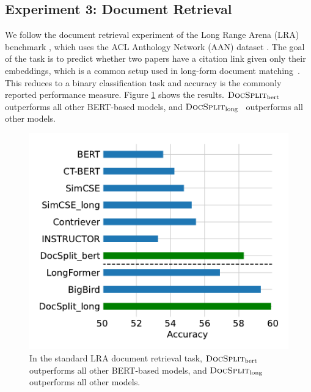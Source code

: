\documentclass[11pt]{article}
\newcommand{\our}{\mbox{\textsc{DocSplit}}}
\newcommand{\ourbert}{$\our_{\mathrm{bert}}$}
\newcommand{\ourlong}{$\our_{\mathrm{long}}$}
\begin{document}
\subsection{Experiment 3: Document Retrieval}
We follow the document retrieval experiment of the Long Range Arena (LRA) benchmark \citep{Tay2020LongRA},
which uses the ACL Anthology Network (AAN) dataset \cite{Radev2009TheAA}.
The goal of the task is to predict whether two papers have a citation link given only their embeddings, which is a common setup used in long-form document matching~\cite{Jiang2019SemanticTM,Yang2020Beyond5T}.
This reduces to a binary classification task and accuracy is the commonly reported performance measure.
Figure \ref{retrieval} shows the results.
\ourbert~ outperforms all other BERT-based models, and \ourlong~ outperforms all other models.

%   

\begin{figure}
\centering
\includegraphics[width=0.8\linewidth]{fig/retrieval_fig.pdf}
\caption{In the standard LRA document retrieval task,
    \ourbert~ outperforms all other BERT-based models,
    and \ourlong~ outperforms all other models.}
\label{retrieval}
\end{figure}
\end{document}
